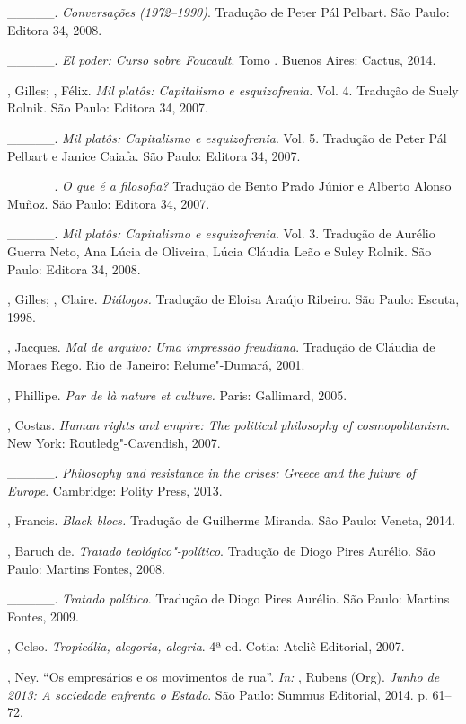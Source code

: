 \begin{Parskip}
\_\_\_\_\_. \emph{Conversações (1972--1990)}. Tradução de Peter Pál
Pelbart. São Paulo: Editora 34, 2008.

\_\_\_\_\_. \emph{El poder: Curso sobre Foucault}. Tomo . Buenos
Aires: Cactus, 2014.

, Gilles; , Félix. \emph{Mil platôs: Capitalismo e
esquizofrenia}. Vol. 4. Tradução de Suely Rolnik. São Paulo: Editora 34, 2007.

\_\_\_\_\_. \emph{Mil platôs: Capitalismo e
esquizofrenia}. Vol. 5. Tradução de Peter Pál Pelbart e Janice Caiafa.
São Paulo: Editora 34, 2007.

\_\_\_\_\_. \emph{O que é a filosofia? }Tradução de
Bento Prado Júnior e Alberto Alonso Muñoz. São Paulo: Editora 34, 2007.

\_\_\_\_\_. \emph{Mil platôs: Capitalismo e
esquizofrenia}. Vol. 3. Tradução de Aurélio Guerra Neto, Ana Lúcia de
Oliveira, Lúcia Cláudia Leão e Suley Rolnik. São Paulo: Editora 34, 2008.

, Gilles; , Claire. \emph{Diálogos.} Tradução de Eloisa
Araújo Ribeiro. São Paulo: Escuta, 1998.

, Jacques. \emph{Mal de arquivo: Uma impressão freudiana}.
Tradução de Cláudia de Moraes Rego. Rio de Janeiro: Relume"-Dumará, 2001.

, Phillipe. \emph{Par de là nature et culture. }Paris:
Gallimard, 2005.

, Costas. \emph{Human rights and empire: The political
philosophy of cosmopolitanism}. New York: Routledg"-Cavendish, 2007.

\_\_\_\_\_. \emph{Philosophy and resistance in the crises:
Greece and the future of Europe}. Cambridge: Polity Press, 2013.

, Francis. \emph{Black blocs. }Tradução de Guilherme
Miranda. São Paulo: Veneta, 2014.

, Baruch de. \emph{Tratado teológico"-político}. Tradução
de Diogo Pires Aurélio. São Paulo: Martins Fontes, 2008.

\_\_\_\_\_. \emph{Tratado político}. Tradução de Diogo Pires
Aurélio. São Paulo: Martins Fontes, 2009.

, Celso. \emph{Tropicália, alegoria, alegria}. 4ª ed.
Cotia: Ateliê Editorial, 2007.

, Ney. ``Os empresários e os movimentos de rua''. \emph{In:} 
, Rubens (Org). \emph{Junho de 2013: A sociedade enfrenta o
Estado}. São Paulo: Summus Editorial, 2014. p. 61--72.


\end{Parskip}

